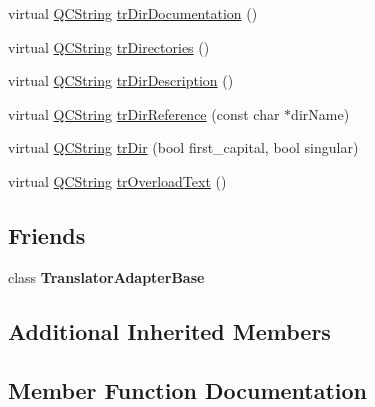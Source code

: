 \begin{DoxyCompactItemize}
\item 
virtual \mbox{\hyperlink{class_q_c_string}{Q\+C\+String}} \mbox{\hyperlink{class_translator_arabic_a42bc84de896868f2309af1cb41abfbaf}{tr\+Dir\+Documentation}} ()
\item 
virtual \mbox{\hyperlink{class_q_c_string}{Q\+C\+String}} \mbox{\hyperlink{class_translator_arabic_a3540585a951e0159a6a4c30266e12db2}{tr\+Directories}} ()
\item 
virtual \mbox{\hyperlink{class_q_c_string}{Q\+C\+String}} \mbox{\hyperlink{class_translator_arabic_a6e5949ba70cda34290d8fb987ff1e4c9}{tr\+Dir\+Description}} ()
\item 
virtual \mbox{\hyperlink{class_q_c_string}{Q\+C\+String}} \mbox{\hyperlink{class_translator_arabic_a64fb5a07d2d3d52921e3f3acdceafb4a}{tr\+Dir\+Reference}} (const char $\ast$dir\+Name)
\item 
virtual \mbox{\hyperlink{class_q_c_string}{Q\+C\+String}} \mbox{\hyperlink{class_translator_arabic_acfbf7905304c071ff1c4c233d27c6021}{tr\+Dir}} (bool first\+\_\+capital, bool singular)
\item 
virtual \mbox{\hyperlink{class_q_c_string}{Q\+C\+String}} \mbox{\hyperlink{class_translator_arabic_ad54045b56a939c9ed9fb492335907cfd}{tr\+Overload\+Text}} ()
\end{DoxyCompactItemize}
\subsection*{Friends}
\begin{DoxyCompactItemize}
\item 
\mbox{\label{class_translator_arabic_a6a27329ec4f8a11907f075e9052d96f7}} 
class {\bfseries Translator\+Adapter\+Base}
\end{DoxyCompactItemize}
\subsection*{Additional Inherited Members}


\subsection{Member Function Documentation}
\mbox{\label{class_translator_arabic_a049f6864014aa4c0b7c886bda990a312}} 
